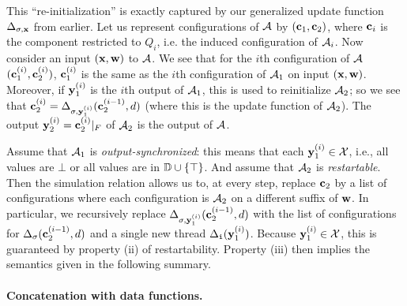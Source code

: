 This ``re-initialization'' is exactly captured by our generalized update function $\Delta_{\sigma, \textbf{x}}$ from earlier. Let us represent configurations of $\mathcal{A}$ by $(\textbf{c}_1, \textbf{c}_2)$, where $\textbf{c}_i$ is the component restricted to $Q_i$, i.e. the induced configuration of $\mathcal{A}_i$.
Now consider an input $(\textbf{x},\textbf{w})$ to $\mathcal{A}$.
We see that for the $i$th configuration of $\mathcal{A}$ $(\textbf{c}_1^{(i)},\textbf{c}_2^{(i)})$, $\textbf{c}_1^{(i)}$ is the same as the $i$th configuration of $\mathcal{A}_1$ on input $(\textbf{x},\textbf{w})$.
Moreover, if $\textbf{y}_1^{(i)}$ is the $i$th output of $\mathcal{A}_1$, this is used to reinitialize $\mathcal{A}_2$;
so we see that $\textbf{c}_2^{(i)} = \Delta_{\sigma,\textbf{y}_1^{(i)}}(\textbf{c}_2^{(i-1)},d)$ (where this is the update function of $\mathcal{A}_2$). The output $\textbf{y}_2^{(i)} = \textbf{c}_2^{(i)}|_F$ of $\mathcal{A}_2$ is the output of $\mathcal{A}$.

Assume that $\mathcal{A}_1$ is \emph{output-synchronized}: this means that each $\textbf{y}_1^{(i)} \in \mathcal{X}$, i.e., all values are $\bot$ or all values are in $\mathbb{D} \cup \{\top\}$. And assume that $\mathcal{A}_2$ is \emph{restartable}. Then the simulation relation allows us to, at every step, replace $\textbf{c}_2$ by a list of configurations where each configuration is $\mathcal{A}_2$ on a different suffix of $\textbf{w}$. In particular, we recursively replace $\Delta_{\sigma, \textbf{y}_1^{(i)}}(\textbf{c}_2^{(i-1)},d)$ with the list of configurations for $\Delta_\sigma(\textbf{c}_2^{(i-1)},d)$ and a single new thread $\Delta_{\texttt{i}}(\textbf{y}_1^{(i)})$. Because $\textbf{y}_1^{(i)} \in \mathcal{X}$, this is guaranteed by property (ii) of restartability. Property (iii) then implies the semantics given in the following summary.

\begin{figure*}[h]

\label{dt:fig:concatenation}
\end{figure*}

\paragraph*{Concatenation with data functions.}

